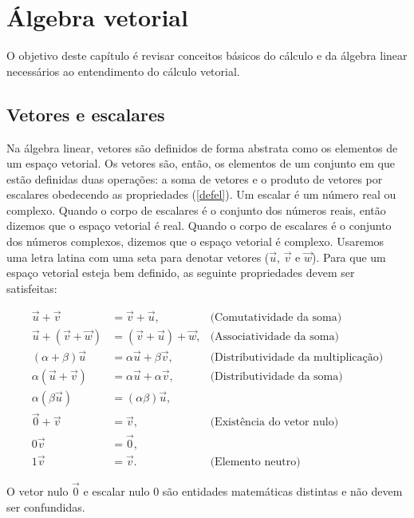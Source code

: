 
\chapter{Álgebra vetorial}
O objetivo deste capítulo é revisar conceitos básicos do cálculo e da álgebra linear necessários ao entendimento do cálculo vetorial.


\section{Vetores e escalares}
Na álgebra linear, vetores são definidos de forma abstrata como os elementos de um espaço vetorial. Os vetores são, então, os elementos de um conjunto em que estão definidas duas operações: a soma de vetores e o produto de vetores por escalares obedecendo as propriedades (\ref{defel}). Um escalar é um número real ou complexo. Quando o corpo de escalares é o conjunto dos números reais, então dizemos que o espaço vetorial é real. Quando o corpo de escalares é o conjunto dos números complexos, dizemos que o espaço vetorial é complexo. Usaremos uma letra latina com uma seta para denotar vetores ($\vec{u}$, $\vec{v}$ e $\vec{w}$).  Para que um espaço vetorial esteja bem definido, as seguinte propriedades devem ser satisfeitas:

\begin{subequations}\label{defel}
\begin{align}
\vec{u}+\vec{v}&=\vec{v}+\vec{u},&\text{(Comutatividade da soma)}\label{defelcom}\\
\vec{u}+\left(\vec{v}+\vec{w}\right)&=\left(\vec{v}+\vec{u}\right)+\vec{w},&\text{(Associatividade da soma)}\label{defelass}\\
\left(\alpha+\beta\right) \vec{u}&=\alpha\vec{u}+\beta\vec{v},&\text{(Distributividade da multiplicação)}\label{defeldist1}\\
\alpha \left(\vec{u}+\vec{v}\right)&= \alpha \vec{u}+\alpha\vec{v},&\text{(Distributividade da soma)}\label{defeldist2}\\
\alpha \left(\beta\vec{u}\right)&=\left(\alpha\beta\right)\vec{u},\label{defeldist3}\\
\vec{0}+\vec{v}&=\vec{v}, &\text{(Existência do vetor nulo)}\label{defelnulo}\\
0\vec{v}&=\vec{0},\label{defelnulo2}\\
1\vec{v}&=\vec{v}.&\text{(Elemento neutro)}\label{defelneutro}
\end{align}
\end{subequations}
\begin{obs} O vetor nulo $\vec{0}$ e escalar nulo $0$ são entidades matemáticas distintas e não devem ser confundidas.\end{obs}

